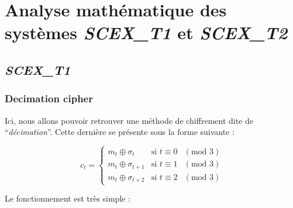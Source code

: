 \section{Analyse mathématique des systèmes \textit{SCEX\_T1} et \textit{SCEX\_T2}}
\subsection{\textit{SCEX\_T1}}
\subsubsection{Decimation cipher}
Ici, nous allons pouvoir retrouver une méthode de chiffrement dite de \enquote{\textit{décimation}}. Cette dernière se présente sous la forme suivante :
\begin{center}
    \begin{equation}
	c_t = \left\{
	    \begin{array}{lll}
		m_{t}\oplus\sigma_{t} & \mbox{si } t\equiv 0 & (\mbox{mod } 3) \\
		m_{t}\oplus\sigma_{t+1} & \mbox{si } t\equiv 1 & (\mbox{mod } 3) \\
		m_{t}\oplus\sigma_{t+2} & \mbox{si } t\equiv 2 & (\mbox{mod } 3)
	    \end{array}
	\right.
	\label{scext1}
    \end{equation}
\end{center}

Le fonctionnement est très simple :

